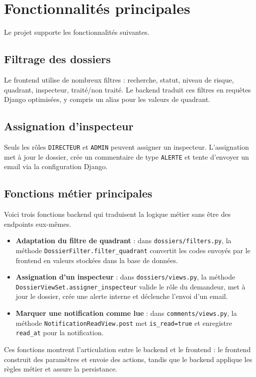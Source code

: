 \documentclass[12pt,a4paper]{article}
\begin{document}
\section{Fonctionnalités principales}
Le projet supporte les fonctionnalités suivantes.

\subsection{Filtrage des dossiers}
Le frontend utilise de nombreux filtres : recherche, statut, niveau de risque, quadrant, inspecteur, traité/non traité. Le backend traduit ces filtres en requêtes Django optimisées, y compris un alias pour les valeurs de quadrant.

\subsection{Assignation d’inspecteur}
Seuls les rôles \texttt{DIRECTEUR} et \texttt{ADMIN} peuvent assigner un inspecteur. L’assignation met à jour le dossier, crée un commentaire de type \texttt{ALERTE} et tente d’envoyer un email via la configuration Django.

\subsection{Fonctions métier principales}
Voici trois fonctions backend qui traduisent la logique métier sans être des endpoints eux-mêmes.
\begin{itemize}
    \item \textbf{Adaptation du filtre de quadrant} : dans \texttt{dossiers/filters.py}, la méthode \texttt{DossierFilter.filter_quadrant} convertit les codes envoyés par le frontend en valeurs stockées dans la base de données.
    \item \textbf{Assignation d'un inspecteur} : dans \texttt{dossiers/views.py}, la méthode \texttt{DossierViewSet.assigner_inspecteur} valide le rôle du demandeur, met à jour le dossier, crée une alerte interne et déclenche l'envoi d'un email.
    \item \textbf{Marquer une notification comme lue} : dans \texttt{comments/views.py}, la méthode \texttt{NotificationReadView.post} met \texttt{is_read=true} et enregistre \texttt{read_at} pour la notification.
\end{itemize}

Ces fonctions montrent l'articulation entre le backend et le frontend : le frontend construit des paramètres et envoie des actions, tandis que le backend applique les règles métier et assure la persistance.
\end{document}
